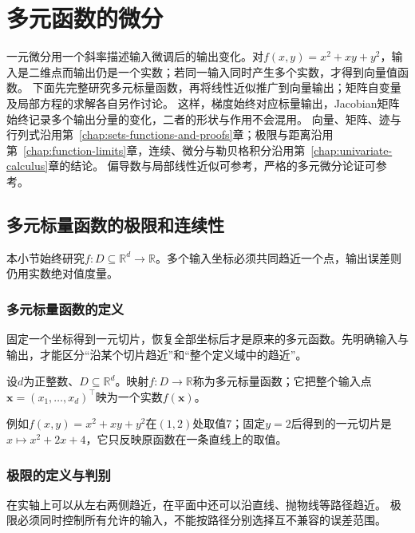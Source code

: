 \par{}
\section{多元函数的微分}
\label{sec:analysis-multivariable-differentiation}
\label{sec:multivariable-differentiation}

一元微分用一个斜率描述输入微调后的输出变化。对$f(x,y)=x^2+xy+y^2$，输入是二维点而输出仍是一个实数；若同一输入同时产生多个实数，才得到向量值函数。
下面先完整研究多元标量函数，再将线性近似推广到向量输出；矩阵自变量及局部方程的求解各自另作讨论。
这样，梯度始终对应标量输出，Jacobian矩阵始终记录多个输出分量的变化，二者的形状与作用不会混用。
向量、矩阵、迹与行列式沿用第~\ref{chap:sets-functions-and-proofs}章；极限与距离沿用第~\ref{chap:function-limits}章，连续、微分与勒贝格积分沿用第~\ref{chap:univariate-calculus}章的结论。
偏导数与局部线性近似可参考，严格的多元微分论证可参考。

\subsection{多元标量函数的极限和连续性}
\label{sec:multivariable-limits-continuity}

本小节始终研究$f:D\subseteq\mathbb R^d\to\mathbb R$。多个输入坐标必须共同趋近一个点，输出误差则仍用实数绝对值度量。

\subsubsection{多元标量函数的定义}

固定一个坐标得到一元切片，恢复全部坐标后才是原来的多元函数。先明确输入与输出，才能区分“沿某个切片趋近”和“整个定义域中的趋近”。
\begin{definition}[多元标量函数]
\label{def:multivariable-scalar-function}
设$d$为正整数、$D\subseteq\mathbb R^d$。映射$f:D\to\mathbb R$称为多元标量函数；它把整个输入点$\bm x=(x_1,\ldots,x_d)^\top$映为一个实数$f(\bm x)$。
\end{definition}
例如$f(x,y)=x^2+xy+y^2$在$(1,2)$处取值$7$；固定$y=2$后得到的一元切片是$x\mapsto x^2+2x+4$，它只反映原函数在一条直线上的取值。

\subsubsection{极限的定义与判别}

在实轴上可以从左右两侧趋近，在平面中还可以沿直线、抛物线等路径趋近。
极限必须同时控制所有允许的输入，不能按路径分别选择互不兼容的误差范围。
